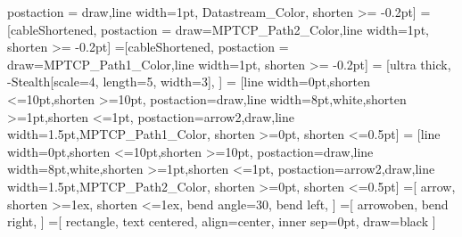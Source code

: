 	postaction = {draw,line width=1pt, Datastream_Color, shorten >= -0.2pt}]%
=[cableShortened,%
	postaction = {draw=MPTCP_Path2_Color,line width=1pt, shorten >= -0.2pt}]%
=[cableShortened,%
	postaction = {draw=MPTCP_Path1_Color,line width=1pt, shorten >= -0.2pt}]%
%
%
 = [ultra thick,%
	-{Stealth[scale=4,%
	length=5,%
	width=3]},%
]%
 = [line width=0pt,shorten <=10pt,shorten >=10pt,%
	postaction={draw,line width=8pt,white,shorten >=1pt,shorten <=1pt},%
	postaction={arrow2,draw,line width=1.5pt,MPTCP_Path1_Color,%
	shorten >=0pt,%
	shorten <=0.5pt}]%
 = [line width=0pt,shorten <=10pt,shorten >=10pt,%
	postaction={draw,line width=8pt,white,shorten >=1pt,shorten <=1pt},%
	postaction={arrow2,draw,line width=1.5pt,MPTCP_Path2_Color,%
	shorten >=0pt,%
	shorten <=0.5pt}]%
%
%
%
%
=[%
	arrow,%
	shorten >=1ex,%
	shorten <=1ex,%
	bend angle=30,%
	bend left,%
]%
=[%
	arrowoben,%
	bend right,%
]%
%
%
%
%
%
%
=[
	rectangle,
	text centered,
	align=center,
	inner sep=0pt,%
	draw=black
]%
%
%
%
%